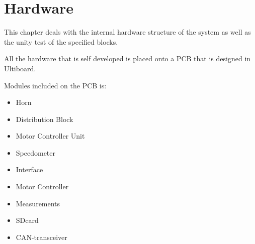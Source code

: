 \chapter{Hardware}
This chapter deals with the internal hardware structure of the system as well as the unity test of the specified blocks.

All the hardware that is self developed is placed onto a PCB that is designed in Ultiboard. 

Modules included on the PCB is:

\begin{itemize}
	\item{Horn}
	\item{Distribution Block}
	\item{Motor Controller Unit}
	\item{Speedometer}
	\item{Interface}
	\item{Motor Controller}
	\item{Measurements}
	\item{SDcard}
	\item{CAN-transceiver}
\end{itemize}














